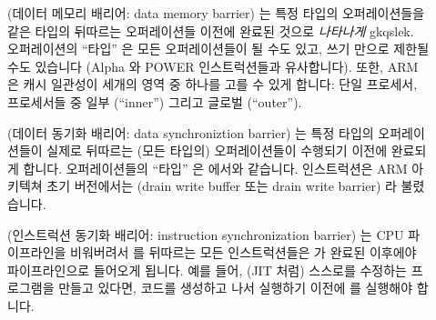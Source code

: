 \begin{description}
\item	[] (데이터 메모리 배리어: data memory barrier) 는 특정 타입의
	오퍼레이션들을 같은 타입의 뒤따르는 오퍼레이션들 이전에 완료된 것으로
	\emph{나타나게} gkqslek.
	오퍼레이션의 ``타입'' 은 모든 오퍼레이션들이 될 수도 있고, 쓰기 만으로
	제한될 수도 있습니다 (Alpha  와 POWER  인스트럭션들과
	유사합니다).
	또한, ARM 은 캐시 일관성이 세개의 영역 중 하나를 고를 수 있게 합니다:
	단일 프로세서, 프로세서들 중 일부 (``inner'') 그리고 글로벌
	(``outer'').
\item	[] (데이터 동기화 배리어: data synchroniztion barrier) 는 특정
	타입의 오퍼레이션들이 실제로 뒤따르는 (모든 타입의) 오퍼레이션들이
	수행되기 이전에 완료되게 합니다.
	오퍼레이션들의 ``타입'' 은  에서와 같습니다.
	 인스트럭션은 ARM 아키텍쳐 초기 버전에서는  (drain
	write buffer 또는 drain write barrier) 라 불렸습니다.
\item	[] (인스트럭션 동기화 배리어: instruction synchronization
	barrier) 는 CPU 파이프라인을 비워버려서  를 뒤따르는 모든
	인스트럭션들은  가 완료된 이후에야 파이프라인으로 들어오게
	됩니다.
	예를 들어, (JIT 처럼) 스스로를 수정하는 프로그램을 만들고 있다면,
	코드를 생성하고 나서 실행하기 이전에  를 실행해야 합니다.

\end{description}

